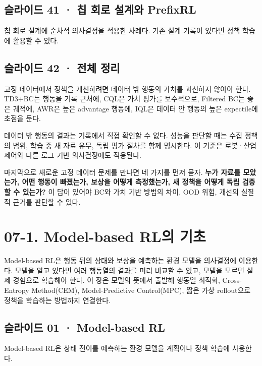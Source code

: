 \documentclass[11pt,a4paper]{article}
\begin{document}
\subsection{슬라이드 41 · 칩 회로 설계와 PrefixRL}

칩 회로 설계에 순차적 의사결정을 적용한 사례다. 기존 설계 기록이 있다면 정책 학습에 활용할 수 있다.\par

\subsection{슬라이드 42 · 전체 정리}

고정 데이터에서 정책을 개선하려면 데이터 밖 행동의 가치를 과신하지 않아야 한다. TD3+BC는 행동을 기록 근처에, CQL은 가치 평가를 보수적으로, Filtered BC는 좋은 궤적에, AWR은 높은 advantage 행동에, IQL은 데이터 안 행동의 높은 expectile에 초점을 둔다.\par

데이터 밖 행동의 결과는 기록에서 직접 확인할 수 없다. 성능을 판단할 때는 수집 정책의 범위, 학습 중 새 자료 유무, 독립 평가 절차를 함께 명시한다. 이 기준은 로봇·산업 제어와 다른 로그 기반 의사결정에도 적용된다.\par

마지막으로 새로운 고정 데이터 문제를 만나면 네 가지를 먼저 묻자. \textbf{누가 자료를 모았는가, 어떤 행동이 빠졌는가, 보상을 어떻게 측정했는가, 새 정책을 어떻게 독립 검증할 수 있는가?} 이 답이 있어야 BC와 가치 기반 방법의 차이, OOD 위험, 개선의 실질적 근거를 판단할 수 있다.\par

\clearpage
\section{07-1. Model-based RL의 기초}


Model-based RL은 행동 뒤의 상태와 보상을 예측하는 환경 모델을 의사결정에 이용한다. 모델을 알고 있다면 여러 행동열의 결과를 미리 비교할 수 있고, 모델을 모르면 실제 경험으로 학습해야 한다. 이 장은 모델의 뜻에서 출발해 행동열 최적화, Cross-Entropy Method(CEM), Model-Predictive Control(MPC), 짧은 가상 rollout으로 정책을 학습하는 방법까지 연결한다.\par

\subsection{슬라이드 01 · Model-based RL}

Model-based RL은 상태 전이를 예측하는 환경 모델을 계획이나 정책 학습에 사용한다.\par
\end{document}
